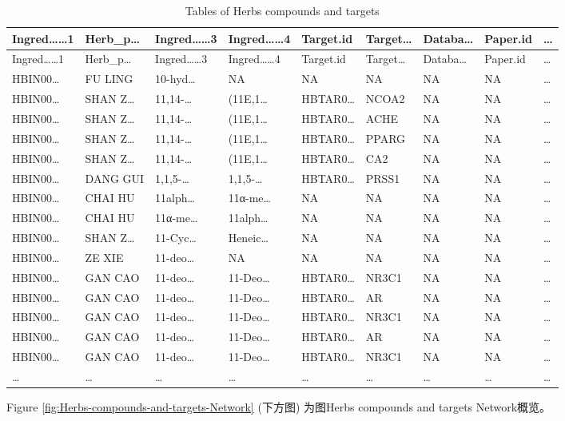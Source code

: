 \documentclass[
]{article}
\begin{document}
\begin{longtable}[]{@{}lllllllll@{}}
\caption{\label{tab:tables-of-Herbs-compounds-and-targets}Tables of Herbs compounds and targets}\tabularnewline
\toprule
Ingred\ldots\ldots1 & Herb\_p\ldots{} & Ingred\ldots\ldots3 & Ingred\ldots\ldots4 & Target.id & Target\ldots{} & Databa\ldots{} & Paper.id & \ldots{}\tabularnewline
\midrule
\endfirsthead
\toprule
Ingred\ldots\ldots1 & Herb\_p\ldots{} & Ingred\ldots\ldots3 & Ingred\ldots\ldots4 & Target.id & Target\ldots{} & Databa\ldots{} & Paper.id & \ldots{}\tabularnewline
\midrule
\endhead
HBIN00\ldots{} & FU LING & 10-hyd\ldots{} & NA & NA & NA & NA & NA & \ldots{}\tabularnewline
HBIN00\ldots{} & SHAN Z\ldots{} & 11,14-\ldots{} & (11E,1\ldots{} & HBTAR0\ldots{} & NCOA2 & NA & NA & \ldots{}\tabularnewline
HBIN00\ldots{} & SHAN Z\ldots{} & 11,14-\ldots{} & (11E,1\ldots{} & HBTAR0\ldots{} & ACHE & NA & NA & \ldots{}\tabularnewline
HBIN00\ldots{} & SHAN Z\ldots{} & 11,14-\ldots{} & (11E,1\ldots{} & HBTAR0\ldots{} & PPARG & NA & NA & \ldots{}\tabularnewline
HBIN00\ldots{} & SHAN Z\ldots{} & 11,14-\ldots{} & (11E,1\ldots{} & HBTAR0\ldots{} & CA2 & NA & NA & \ldots{}\tabularnewline
HBIN00\ldots{} & DANG GUI & 1,1,5-\ldots{} & 1,1,5-\ldots{} & HBTAR0\ldots{} & PRSS1 & NA & NA & \ldots{}\tabularnewline
HBIN00\ldots{} & CHAI HU & 11alph\ldots{} & 11α-me\ldots{} & NA & NA & NA & NA & \ldots{}\tabularnewline
HBIN00\ldots{} & CHAI HU & 11α-me\ldots{} & 11alph\ldots{} & NA & NA & NA & NA & \ldots{}\tabularnewline
HBIN00\ldots{} & SHAN Z\ldots{} & 11-Cyc\ldots{} & Heneic\ldots{} & NA & NA & NA & NA & \ldots{}\tabularnewline
HBIN00\ldots{} & ZE XIE & 11-deo\ldots{} & NA & NA & NA & NA & NA & \ldots{}\tabularnewline
HBIN00\ldots{} & GAN CAO & 11-deo\ldots{} & 11-Deo\ldots{} & HBTAR0\ldots{} & NR3C1 & NA & NA & \ldots{}\tabularnewline
HBIN00\ldots{} & GAN CAO & 11-deo\ldots{} & 11-Deo\ldots{} & HBTAR0\ldots{} & AR & NA & NA & \ldots{}\tabularnewline
HBIN00\ldots{} & GAN CAO & 11-deo\ldots{} & 11-Deo\ldots{} & HBTAR0\ldots{} & NR3C1 & NA & NA & \ldots{}\tabularnewline
HBIN00\ldots{} & GAN CAO & 11-deo\ldots{} & 11-Deo\ldots{} & HBTAR0\ldots{} & AR & NA & NA & \ldots{}\tabularnewline
HBIN00\ldots{} & GAN CAO & 11-deo\ldots{} & 11-Deo\ldots{} & HBTAR0\ldots{} & NR3C1 & NA & NA & \ldots{}\tabularnewline
\ldots{} & \ldots{} & \ldots{} & \ldots{} & \ldots{} & \ldots{} & \ldots{} & \ldots{} & \ldots{}\tabularnewline
\bottomrule
\end{longtable}

Figure \ref{fig:Herbs-compounds-and-targets-Network} (下方图) 为图Herbs compounds and targets Network概览。
\end{document}
